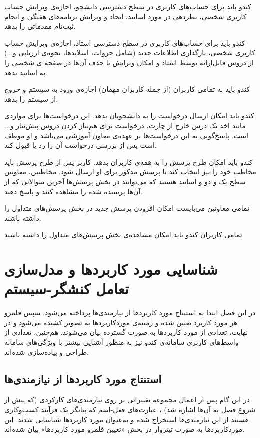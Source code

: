 \documentclass{report}
\begin{document}
کندو باید برای حساب‌های کاربری در سطح دسترسی دانشجو، اجازه‌ی ویرایش حساب‌ کاربری شخصی، نظردهی در مورد اساتید، ایجاد و ویرایش برنامه‌های هفتگی و انجام ثبت‌نام مقدماتی را بدهد.

کندو باید برای حساب‌های کاربری در سطح دسترسی استاد، اجازه‌ی ویرایش حساب‌ کاربری شخصی، بارگذاری اطلاعات جدید (شامل جزوات، اسلایدها، نحوه‌ی ارزیابی و...) از دروس قابل‌ارائه توسط استاد و امکان ویرایش یا حذف آن‌ها  در صفحه ی شخصی را به اساتید بدهد.

کندو باید به تمامی کاربران (از جمله کاربران مهمان) اجازه‌ی ورود به سیستم و خروج از سیستم را بدهد.

کندو باید امکان ارسال درخواست را به دانشجویان بدهد. این درخواست‌ها برای مواردی مانند اخذ یک درس خارج از چارت، درخواست برای هم‌نیاز کردن دروس پیش‌نیاز و... است. پاسخ‌گویی به این درخواست‌ها بر عهده‌ی معاون آموزشی می‌باشد و او موظف است پس از بررسی درخواست  آن را رد یا قبول کند.

کندو باید امکان طرح پرسش را به همه‌ی کاربران بدهد. کاربر پس از طرح پرسش باید مخاطب خود را نیز انتخاب کند تا پرسش مذکور برای او ارسال شود. مخاطبین، معاونین سطح یک و دو و اساتید هستند که می‌توانند در بخش پرسش‌ها آخرین سوالاتی که از آن‌ها پرسیده شده را مشاهده کنند و پاسخ دهند.

تمامی معاونین می‌بایست امکان افزودن پرسش جدید در بخش پرسش‌های متداول را داشته باشند.

تمامی کاربران کندو باید امکان مشاهده‌ی بخش پرسش‌های متداول را داشته باشند.

\chapter{شناسایی مورد کاربردها و مدل‌سازی تعامل کنشگر-سیستم}
در این فصل ابتدا به استنتاج مورد کاربردها
از نیازمندی‌ها پرداخته می‌شود. سپس قلمرو هر مورد کاربرد تعیین شده و زمینه‌ی موردکاربردها به تصویر کشیده می‌شود و در نهایت، تعدادی از مورد کاربردها به صورت گسترده بیان می‌شوند. هم‌چنین، تعدادی از واسط‌های کاربری سامانه‌ی کندو نیز به منظور آشنایی بیشتر با ویژگی‌های سامانه  طراحی و پیاده‌سازی شده‌اند.

\section{استنتاج مورد کاربردها از نیازمندی‌ها}
در این گام پس از اعمال مجموعه تغییراتی بر روی نیازمندی‌های کارکردی (که پیش از شروع فصل به آن‌ها اشاره شد) ، عبارت‌های فعل-اسم که بیانگر یک فرآیند‌ کسب‌وکاری هستند از این نیازمندی‌ها استخراج شده و به‌عنوان مورد کاربردها شناسایی شدند. این موردکاربردها به صورت تیتروار در بخش «تعیین قلمرو مورد کاربردها» بیان شده‌اند.
\end{document}
